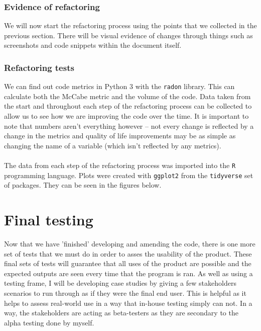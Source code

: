 \documentclass[9pt]{article}
\begin{document}
\subsubsection{Evidence of refactoring}
We will now start the refactoring process using the points that we collected in the previous section. There will be visual evidence of changes through things such as screenshots and code snippets within the document itself. 

\subsubsection{Refactoring tests}
We can find out code metrics in Python 3 with the \texttt{radon} library. This can calculate both the McCabe metric and the volume of the code. Data taken from the start and throughout each step of the refactoring process can be collected to allow us to see how we are improving the code over the time. It is important to note that numbers aren't everything however -- not every change is reflected by a change in the metrics and quality of life improvements may be as simple as changing the name of a variable (which isn't reflected by any metrics).\\\\
The data from each step of the refactoring process was imported into the \texttt{R} programming language. Plots were created with \texttt{ggplot2} from the \texttt{tidyverse} set of packages. They can be seen in the figures below.










\newpage
\section{Final testing}
Now that we have 'finished' developing and amending the code, there is one more set of tests that we must do in order to asses the usability of the product. These final sets of tests will guarantee that all uses of the product are possible and the expected outputs are seen every time that the program is ran. As well as using a testing frame, I will be developing case studies by giving a few stakeholders scenarios to run through as if they were the final end user. This is helpful as it helps to assess real-world use in a way that in-house testing simply can not. In a way, the stakeholders are acting as beta-testers as they are secondary to the alpha testing done by myself.
\end{document}
